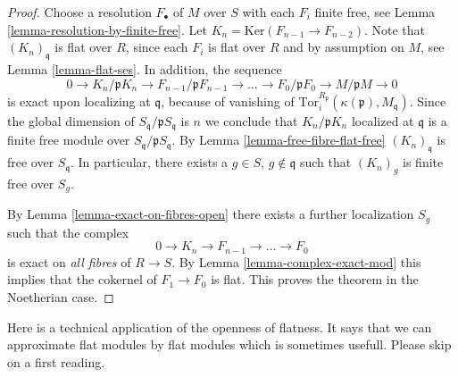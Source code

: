 \begin{proof}
\medskip\noindent
Choose a resolution $F_\bullet$ of $M$ over $S$ with each
$F_i$ finite free, see Lemma \ref{lemma-resolution-by-finite-free}.
Let $K_n = \text{Ker}(F_{n-1} \to F_{n-2})$. Note that
$(K_n)_{\mathfrak q}$ is flat over $R$, since each $F_i$
is flat over $R$ and by assumption on $M$, see Lemma
\ref{lemma-flat-ses}. In addition, the sequence
$$
0 \to
K_n/\mathfrak p K_n \to
F_{n-1}/ \mathfrak p F_{n-1} \to
\ldots \to
F_0 / \mathfrak p F_0 \to
M/\mathfrak p M \to
0
$$
is exact upon localizing at $\mathfrak q$, because of vanishing
of $\text{Tor}_i^{R_\mathfrak p}(\kappa(\mathfrak p), M_{\mathfrak q})$.
Since the global dimension of $S_\mathfrak q/\mathfrak p S_{\mathfrak q}$
is $n$ we conclude that $K_n / \mathfrak p K_n$ localized
at $\mathfrak q$ is a finite free module over
$S_\mathfrak q/\mathfrak p S_{\mathfrak q}$. By
Lemma \ref{lemma-free-fibre-flat-free} $(K_n)_{\mathfrak q}$
is free over $S_{\mathfrak q}$. In particular, there exists a
$g \in S$, $g \not \in \mathfrak q$ such that $(K_n)_g$
is finite free over $S_g$.

\medskip\noindent
By Lemma \ref{lemma-exact-on-fibres-open}
there exists a further localization $S_g$ such that
the complex
$$
0 \to K_n \to F_{n-1} \to \ldots \to F_0
$$
is exact on {\it all fibres} of $R \to S$. By
Lemma \ref{lemma-complex-exact-mod}
this implies that the cokernel of $F_1 \to F_0$ is
flat. This proves the theorem in the Noetherian case.
\end{proof}

\noindent
Here is a technical application of the openness of flatness.
It says that we can approximate flat modules by flat modules
which is sometimes usefull. Please skip on a first reading.

